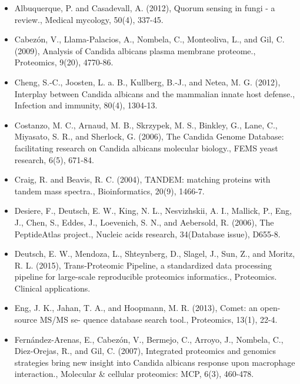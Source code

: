 \begin{itemize}

\item[]{%
Albuquerque, P. and Casadevall, A. (2012), Quorum sensing in fungi - a review.,
Medical mycology, 50(4), 337-45.
}

\item[]{%
Cabez\'on, V., Llama-Palacios, A., Nombela, C., Monteoliva, L., and Gil, C. (2009), Analysis of
Candida albicans plasma membrane proteome., Proteomics, 9(20), 4770-86.
}


\item[]{%
Cheng, S.-C., Joosten, L. a. B., Kullberg, B.-J., and Netea, M. G. (2012), Interplay between
Candida albicans and the mammalian innate host defense., Infection and immunity, 80(4),
1304-13.
}

\item[]{%
Costanzo, M. C., Arnaud, M. B., Skrzypek, M. S., Binkley, G., Lane, C., Miyasato, S. R., and
Sherlock, G. (2006), The Candida Genome Database: facilitating research on 
Candida albicans molecular biology., FEMS yeast research, 6(5), 671-84.
}

\item[]{%
Craig, R. and Beavis, R. C. (2004), TANDEM: matching proteins with tandem mass spectra.,
Bioinformatics, 20(9), 1466-7.
}

\item[]{%
Desiere, F., Deutsch, E. W., King, N. L., Nesvizhskii, A. I., Mallick, P., Eng, J., Chen, S., Eddes,
J., Loevenich, S. N., and Aebersold, R. (2006), The PeptideAtlas project., Nucleic acids
research, 34(Database issue), D655-8.
}

\item[]{%
Deutsch, E. W., Mendoza, L., Shteynberg, D., Slagel, J., Sun, Z., and Moritz, R. L. (2015),
Trans-Proteomic Pipeline, a standardized data processing pipeline for large-scale 
reproducible proteomics informatics., Proteomics. Clinical applications.
}

\item[]{%
Eng, J. K., Jahan, T. A., and Hoopmann, M. R. (2013), Comet: an open-source MS/MS se-
quence database search tool., Proteomics, 13(1), 22-4.
}

\item[]{%
Fern\'andez-Arenas, E., Cabez\'on, V., Bermejo, C., Arroyo, J., Nombela, C., Diez-Orejas, R.,
and Gil, C. (2007), Integrated proteomics and genomics strategies bring new insight into
Candida albicans response upon macrophage interaction., 
Molecular \& cellular proteomics: MCP, 6(3), 460-478.
}


\end{itemize}
